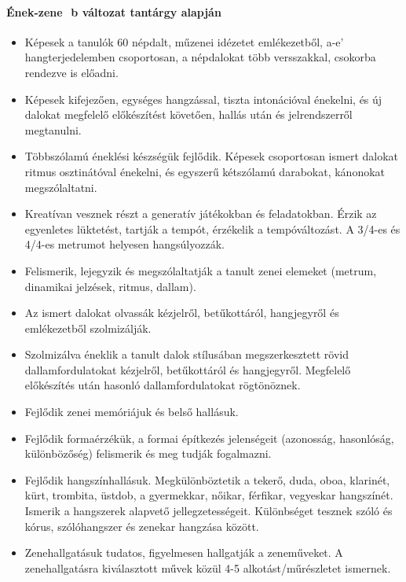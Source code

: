 \paragraph{Ének-zene
﻿  b változat tantárgy alapján}
\begin{itemize}
\item Képesek a tanulók 60 népdalt, műzenei idézetet emlékezetből, a-e’ hangterjedelemben csoportosan, a népdalokat több versszakkal, csokorba rendezve is előadni.
\item Képesek kifejezően, egységes hangzással, tiszta intonációval énekelni, és új dalokat megfelelő előkészítést követően, hallás után és jelrendszerről megtanulni.
\item Többszólamú éneklési készségük fejlődik. Képesek csoportosan ismert dalokat ritmus osztinátóval énekelni, és egyszerű kétszólamú darabokat, kánonokat megszólaltatni.
\item Kreatívan vesznek részt a generatív játékokban és feladatokban. Érzik az egyenletes lüktetést, tartják a tempót, érzékelik a tempóváltozást. A 3/4-es és 4/4-es metrumot helyesen hangsúlyozzák.
\item Felismerik, lejegyzik és megszólaltatják a tanult zenei elemeket (metrum, dinamikai jelzések, ritmus, dallam).
\item Az ismert dalokat olvassák kézjelről, betűkottáról, hangjegyről és emlékezetből szolmizálják.
\item Szolmizálva éneklik a tanult dalok stílusában megszerkesztett rövid dallamfordulatokat kézjelről, betűkottáról és hangjegyről. Megfelelő előkészítés után hasonló dallamfordulatokat rögtönöznek.
\item Fejlődik zenei memóriájuk és belső hallásuk.
\item Fejlődik formaérzékük, a formai építkezés jelenségeit (azonosság, hasonlóság, különbözőség) felismerik és meg tudják fogalmazni.
\item Fejlődik hangszínhallásuk. Megkülönböztetik a tekerő, duda, oboa, klarinét, kürt, trombita, üstdob, a gyermekkar, nőikar, férfikar, vegyeskar hangszínét. Ismerik a hangszerek alapvető jellegzetességeit. Különbséget tesznek szóló és kórus, szólóhangszer és zenekar hangzása között.
\item Zenehallgatásuk tudatos, figyelmesen hallgatják a zeneműveket. A zenehallgatásra kiválasztott művek közül 4-5 alkotást/műrészletet ismernek.
\end{itemize}
